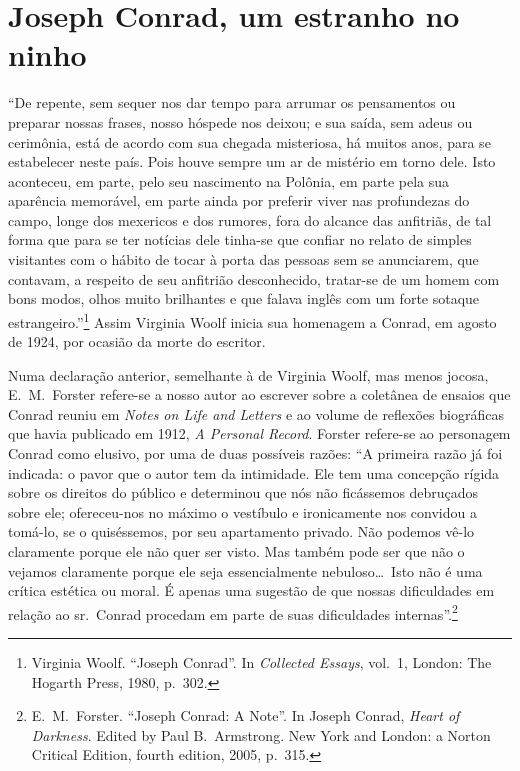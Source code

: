 


\section{Joseph Conrad, um estranho no ninho}

``De repente, sem sequer nos dar tempo para arrumar os
pensamentos ou preparar nossas frases, nosso hóspede nos deixou; e sua
saída, sem adeus ou cerimônia, está de acordo com sua chegada
misteriosa, há muitos anos, para se estabelecer neste país. Pois houve
sempre um ar de mistério em torno dele. Isto aconteceu, em parte, pelo
seu nascimento na Polônia, em parte pela sua aparência memorável, em
parte ainda por preferir viver nas profundezas do campo, longe dos
mexericos e dos rumores, fora do alcance das anfitriãs, de tal forma
que para se ter notícias dele tinha{}-se que confiar no relato de
simples visitantes com o hábito de tocar à porta das pessoas sem se
anunciarem, que contavam, a respeito de seu anfitrião desconhecido,
tratar{}-se de um homem com bons modos, olhos muito brilhantes e que
falava inglês com um forte sotaque estrangeiro.''\footnote{ Virginia
Woolf. ``Joseph Conrad''. In \textit{Collected Essays}, vol.~1, London: The
Hogarth Press, 1980, p.~302.} Assim Virginia Woolf inicia sua homenagem a Conrad, em agosto
de 1924, por ocasião da  morte do escritor. 

Numa declaração anterior, semelhante à de Virginia Woolf, mas
menos jocosa, E.~M.~Forster refere{}-se a nosso autor ao escrever sobre
a coletânea de ensaios que Conrad reuniu em \textit{Notes on
Life and Letters} e ao volume de reflexões biográficas que
havia publicado em 1912, \textit{A Personal Record}. 
Forster refere{}-se ao personagem Conrad como elusivo, por uma de duas
possíveis razões: ``A primeira razão já foi indicada: o pavor que o
autor tem da intimidade. Ele tem uma concepção rígida sobre os direitos
do público e determinou que nós não ficássemos debruçados sobre ele;
ofereceu{}-nos  no máximo o vestíbulo e ironicamente nos convidou a
tomá{}-lo, se o quiséssemos, por seu apartamento privado. Não podemos
vê{}-lo claramente porque ele não quer ser visto. Mas também pode ser
que não o vejamos claramente porque ele seja essencialmente
nebuloso\ldots\ Isto não é uma crítica estética ou moral. É apenas uma
sugestão de que nossas dificuldades em relação ao sr.~Conrad procedam
em parte de suas dificuldades internas''.\footnote{ E.~M.~Forster. ``Joseph Conrad: 
A Note''. In Joseph Conrad, \textit{Heart of Darkness}. Edited by Paul B.~Armstrong. 
New York and London: a Norton Critical Edition, fourth edition, 2005, p.~315.}


